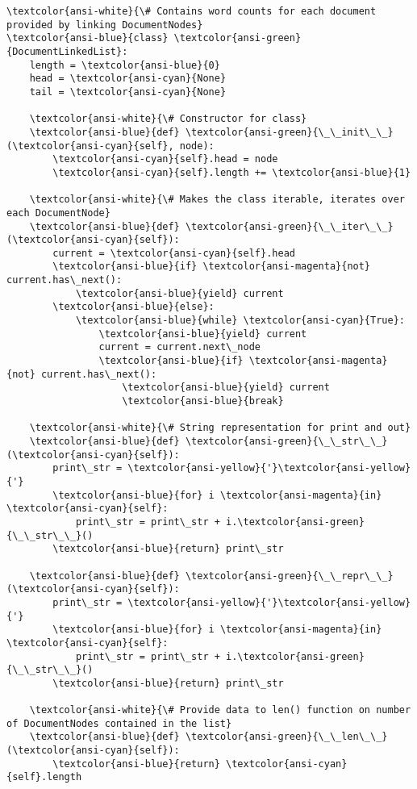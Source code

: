 \documentclass[11pt]{article}
\begin{document}
\begin{Verbatim}[commandchars=\\\{\}]
\textcolor{ansi-white}{\# Contains word counts for each document provided by linking DocumentNodes}
\textcolor{ansi-blue}{class} \textcolor{ansi-green}{DocumentLinkedList}:
    length = \textcolor{ansi-blue}{0}
    head = \textcolor{ansi-cyan}{None}
    tail = \textcolor{ansi-cyan}{None}

    \textcolor{ansi-white}{\# Constructor for class}
    \textcolor{ansi-blue}{def} \textcolor{ansi-green}{\_\_init\_\_}(\textcolor{ansi-cyan}{self}, node):
        \textcolor{ansi-cyan}{self}.head = node
        \textcolor{ansi-cyan}{self}.length += \textcolor{ansi-blue}{1}

    \textcolor{ansi-white}{\# Makes the class iterable, iterates over each DocumentNode}
    \textcolor{ansi-blue}{def} \textcolor{ansi-green}{\_\_iter\_\_}(\textcolor{ansi-cyan}{self}):
        current = \textcolor{ansi-cyan}{self}.head
        \textcolor{ansi-blue}{if} \textcolor{ansi-magenta}{not} current.has\_next():
            \textcolor{ansi-blue}{yield} current
        \textcolor{ansi-blue}{else}:
            \textcolor{ansi-blue}{while} \textcolor{ansi-cyan}{True}:
                \textcolor{ansi-blue}{yield} current
                current = current.next\_node
                \textcolor{ansi-blue}{if} \textcolor{ansi-magenta}{not} current.has\_next():
                    \textcolor{ansi-blue}{yield} current
                    \textcolor{ansi-blue}{break}

    \textcolor{ansi-white}{\# String representation for print and out}
    \textcolor{ansi-blue}{def} \textcolor{ansi-green}{\_\_str\_\_}(\textcolor{ansi-cyan}{self}):
        print\_str = \textcolor{ansi-yellow}{'}\textcolor{ansi-yellow}{'}
        \textcolor{ansi-blue}{for} i \textcolor{ansi-magenta}{in} \textcolor{ansi-cyan}{self}:
            print\_str = print\_str + i.\textcolor{ansi-green}{\_\_str\_\_}()
        \textcolor{ansi-blue}{return} print\_str

    \textcolor{ansi-blue}{def} \textcolor{ansi-green}{\_\_repr\_\_}(\textcolor{ansi-cyan}{self}):
        print\_str = \textcolor{ansi-yellow}{'}\textcolor{ansi-yellow}{'}
        \textcolor{ansi-blue}{for} i \textcolor{ansi-magenta}{in} \textcolor{ansi-cyan}{self}:
            print\_str = print\_str + i.\textcolor{ansi-green}{\_\_str\_\_}()
        \textcolor{ansi-blue}{return} print\_str

    \textcolor{ansi-white}{\# Provide data to len() function on number of DocumentNodes contained in the list}
    \textcolor{ansi-blue}{def} \textcolor{ansi-green}{\_\_len\_\_}(\textcolor{ansi-cyan}{self}):
        \textcolor{ansi-blue}{return} \textcolor{ansi-cyan}{self}.length


\end{Verbatim}
\end{document}
